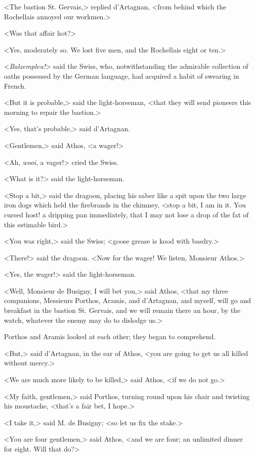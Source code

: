 <The bastion St. Gervais,> replied d'Artagnan, <from behind which the Rochellais annoyed our workmen.> 

<Was that affair hot?> 

<Yes, moderately so. We lost five men, and the Rochellais eight or ten.> 

<\textit{Balzempleu!}> said the Swiss, who, notwithstanding the admirable collection of oaths possessed by the German language, had acquired a habit of swearing in French. 

<But it is probable,> said the light-horseman, <that they will send pioneers this morning to repair the bastion.> 

<Yes, that's probable,> said d'Artagnan. 

<Gentlemen,> said Athos, <a wager!> 

<Ah, \textit{wooi}, a vager!> cried the Swiss. 

<What is it?> said the light-horseman. 

<Stop a bit,> said the dragoon, placing his saber like a spit upon the two large iron dogs which held the firebrands in the chimney, <stop a bit, I am in it. You cursed host! a dripping pan immediately, that I may not lose a drop of the fat of this estimable bird.> 

<You was right,> said the Swiss; <goose grease is kood with basdry.> 

<There!> said the dragoon. <Now for the wager! We listen, Monsieur Athos.> 

<Yes, the wager!> said the light-horseman. 

<Well, Monsieur de Busigny, I will bet you,> said Athos, <that my three companions, Messieurs Porthos, Aramis, and d'Artagnan, and myself, will go and breakfast in the bastion St. Gervais, and we will remain there an hour, by the watch, whatever the enemy may do to dislodge us.> 

Porthos and Aramis looked at each other; they began to comprehend. 

<But,> said d'Artagnan, in the ear of Athos, <you are going to get us all killed without mercy.> 

<We are much more likely to be killed,> said Athos, <if we do not go.> 

<My faith, gentlemen,> said Porthos, turning round upon his chair and twisting his moustache, <that's a fair bet, I hope.> 

<I take it,> said M. de Busigny; <so let us fix the stake.> 

<You are four gentlemen,> said Athos, <and we are four; an unlimited dinner for eight. Will that do?> 

